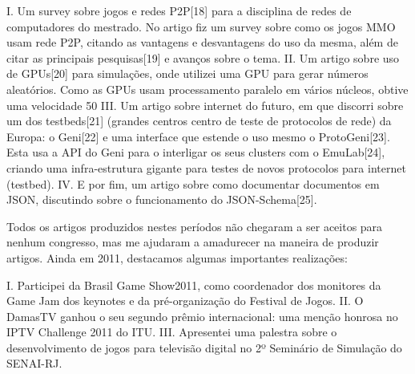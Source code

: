 \documentclass[10pt,a4paper,oneside]{book}
\begin{document}
I.  Um survey sobre jogos e redes P2P[18] para a disciplina de redes de computadores do mestrado. No artigo fiz um survey sobre como os jogos MMO usam rede P2P, citando as vantagens e desvantagens do uso da mesma, além de citar as principais pesquisas[19] e avanços sobre o tema.
II. Um artigo sobre uso de GPUs[20] para simulações, onde utilizei uma GPU para gerar números aleatórios. Como as GPUs usam processamento paralelo em vários núcleos, obtive uma velocidade 50%
III. Um artigo sobre internet do futuro, em que discorri sobre um dos testbeds[21] (grandes centros centro de teste de protocolos de rede) da Europa: o Geni[22] e uma interface que estende o uso mesmo o ProtoGeni[23]. Esta usa a API do Geni para o interligar os seus clusters com o EmuLab[24],  criando uma infra-estrutura gigante para testes de novos protocolos para internet (testbed).
IV. E por fim, um artigo sobre como documentar documentos em JSON, discutindo sobre o funcionamento do JSON-Schema[25].

Todos os artigos produzidos nestes períodos não chegaram a ser aceitos para nenhum congresso, mas me ajudaram a amadurecer na maneira de produzir artigos. Ainda em 2011, destacamos algumas importantes realizações:

I. Participei da Brasil Game Show2011, como coordenador dos monitores da Game Jam dos keynotes e da pré-organização do Festival de Jogos.
II. O DamasTV ganhou o seu segundo prêmio internacional: uma menção honrosa no IPTV Challenge 2011 do ITU.
III. Apresentei uma palestra sobre o desenvolvimento de jogos para televisão digital no 2º Seminário de Simulação do SENAI-RJ.
\end{document}
